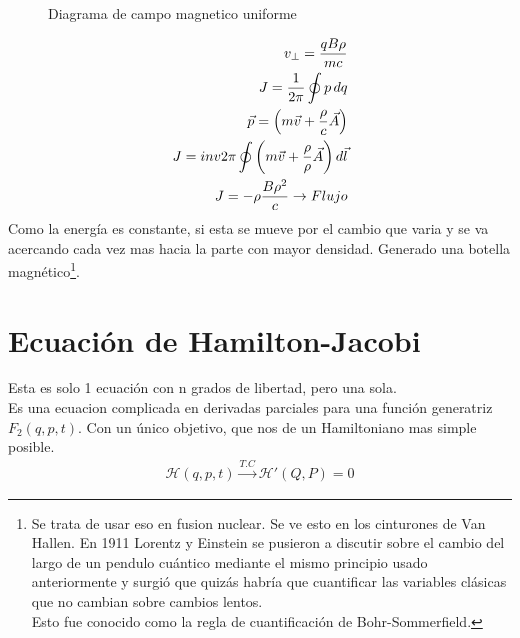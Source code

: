 \documentclass[12pt]{article}
\renewcommand{\H}{\mathcal{H}}
\newcommand{\s}[1]{\section{#1}}
\newcommand{\inv}[1]{\frac{1}{#1}}
\begin{document}
\begin{enumerate}
\begin{figure}[h!]
    \caption{Diagrama de campo magnetico uniforme}
    \label{dg_cm}
\end{figure}	
\begin{align}
v_\perp	=\frac{qB\rho}{mc}\\
J=\inv{2\pi}\oint p\,  dq\\
\vec{p}=\qty(m\vec{v} + \frac{\rho}{c}\vec{A})\\
J = inv{2\pi} \oint \qty(m\vec{v} + \frac{\rho}{\rho}\vec{A}) \, d\vec{l}\\
J= - \rho \frac{B\rho^2}{c} \rightarrow Flujo
\end{align}
Como la energía es constante, si esta se mueve por el cambio que varia y se va acercando cada vez mas hacia la parte con mayor densidad. Generado una botella magnético\footnote{Se trata de usar eso en fusion nuclear.
Se ve esto en los cinturones de Van Hallen. En 1911 Lorentz y Einstein se pusieron a discutir sobre el cambio del largo de un pendulo cuántico mediante el mismo principio usado anteriormente y surgió que quizás habría que cuantificar las variables clásicas que no cambian sobre cambios lentos.\\ Esto fue conocido como la regla de cuantificación de Bohr-Sommerfield.}.\\
\end{enumerate}
\s{Ecuación de Hamilton-Jacobi}
Esta es solo 1 ecuación con n grados de libertad, pero una sola.\\
Es una ecuacion complicada en derivadas parciales para una función generatriz $F_2(q,p,t)$. Con un único objetivo, que nos de un Hamiltoniano mas simple posible.
\begin{align}
 \H(q,p,t) \xrightarrow{T.C} \H'(Q,P)=0	
\end{align}
\end{document}
